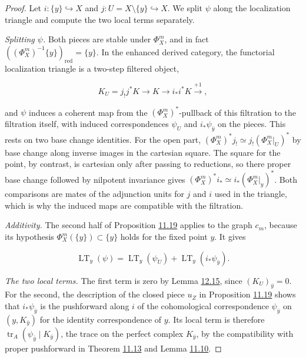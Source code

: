 \documentclass[11pt]{article}
\begin{document}
\begin{proof}[{Proof}]\label{bp275}%
Let \(i:\{y\}\hookrightarrow X\) and \(j:U=X\setminus\{y\}\hookrightarrow X\). We split \(\psi\) along the localization triangle and compute the two local terms separately.

\emph{Splitting \(\psi\).} Both pieces are stable under \(\Phi_X^m\), and in fact \(((\Phi_X^m)^{-1}\{y\})_{\mathrm{red}}=\{y\}\). In the enhanced derived category, the functorial localization triangle is a two-step filtered object,

\[
K_U=j_!j^*K\longrightarrow K\longrightarrow i_*i^*K
\xrightarrow{+1},
\]

and \(\psi\) induces a coherent map from the \((\Phi_X^m)^*\)-pullback of this filtration to the filtration itself, with induced correspondences \(\psi_U\) and \(i_*\psi_{\bar y}\) on the pieces. This rests on two base change identities. For the open part, \((\Phi_X^m)^*j_!\simeq j_!(\Phi_X^m|_U)^*\) by base change along inverse images in the cartesian square. The square for the point, by contrast, is cartesian only after passing to reductions, so there proper base change followed by nilpotent invariance gives \((\Phi_X^m)^*i_*\simeq i_*(\Phi_X^m|_y)^*\). Both comparisons are mates of the adjunction units for \(j\) and \(i\) used in the triangle, which is why the induced maps are compatible with the filtration.

\emph{Additivity.} The second half of Proposition \hyperref[bp223]{11.19} applies to the graph \(c_m\), because its hypothesis \(\Phi_X^m(\{y\})\subset\{y\}\) holds for the fixed point \(y\). It gives

\[
\operatorname{LT}_y(\psi)
=\operatorname{LT}_y(\psi_U)
+\operatorname{LT}_y(i_*\psi_{\bar y}).
\]

\emph{The two local terms.} The first term is zero by Lemma \hyperref[bp270]{12.15}, since \((K_U)_{\bar y}=0\). For the second, the description of the closed piece \(u_Z\) in Proposition \hyperref[bp223]{11.19} shows that \(i_*\psi_{\bar y}\) is the pushforward along \(i\) of the cohomological correspondence \(\psi_{\bar y}\) on \((y,K_{\bar y})\) for the identity correspondence of \(y\). Its local term is therefore \(\operatorname{tr}_A(\psi_{\bar y}\mid K_{\bar y})\), the trace on the perfect complex \(K_{\bar y}\), by the compatibility with proper pushforward in Theorem \hyperref[bp206]{11.13} and Lemma \hyperref[bp199]{11.10}.
\end{proof}
\end{document}
